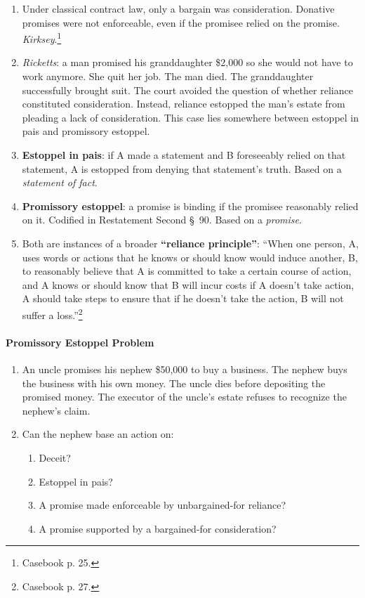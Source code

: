 \begin{enumerate}
    \item Under classical contract law, only a bargain was consideration. 
    Donative promises were not enforceable, even if the promisee relied on the 
    promise. \emph{Kirksey}.\footnote{Casebook p. 25.}
    \item \emph{Ricketts}: a man promised his granddaughter \$2,000 so she 
    would not have to work anymore. She quit her job. The man died. The 
    granddaughter successfully brought suit. The court avoided the question of 
    whether reliance constituted consideration. Instead, reliance estopped the 
    man's estate from pleading a lack of consideration. This case lies 
    somewhere between estoppel in pais and promissory estoppel.
    \item \textbf{Estoppel in pais}: if A made a statement and B foreseeably 
    relied on that statement, A is estopped from denying that statement's 
    truth. Based on a \emph{statement of fact}.
    \item \textbf{Promissory estoppel}: a promise is binding if the promisee 
    reasonably relied on it. Codified in Restatement Second \S\ 90. Based on a 
    \emph{promise}.
    \item Both are instances of a broader \textbf{``reliance principle''}: 
    ``When one person, A, uses words or actions that he knows or should know 
    would induce another, B, to reasonably believe that A is committed to take 
    a certain course of action, and A knows or should know that B will incur 
    costs if A doesn't take action, A should take steps to ensure that if he 
    doesn't take the action, B will not suffer a loss.''\footnote{Casebook p. 
    27.}
\end{enumerate}

\paragraph{Promissory Estoppel Problem}

\begin{enumerate}
    \item An uncle promises his nephew \$50,000 to buy a business. The nephew 
    buys the business with his own money. The uncle dies before depositing the 
    promised money. The executor of the uncle's estate refuses to recognize 
    the nephew's claim.
    \item Can the nephew base an action on:
    \begin{enumerate}
        \item Deceit?
        \item Estoppel in pais?
        \item A promise made enforceable by unbargained-for reliance?
        \item A promise supported by a bargained-for consideration?
    \end{enumerate}
\end{enumerate}

